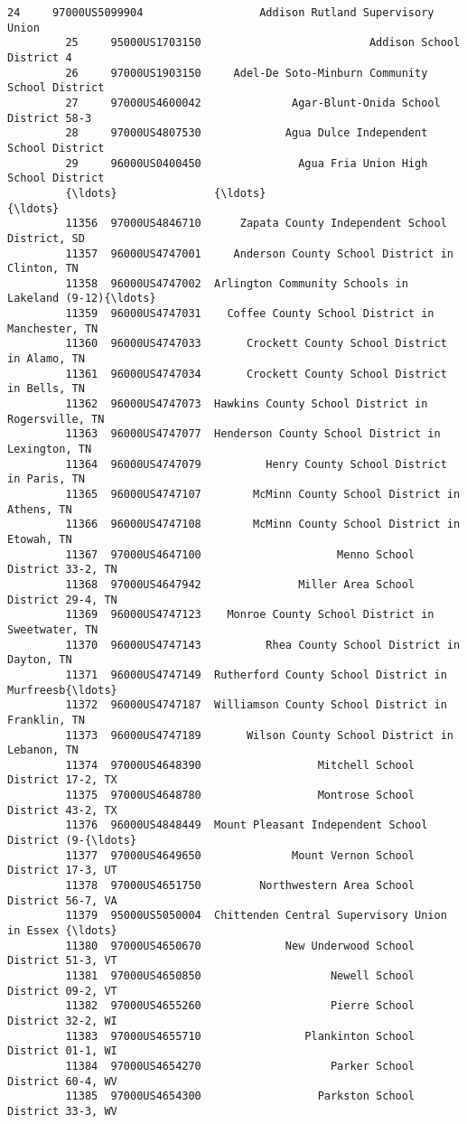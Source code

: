\documentclass[11pt]{article}
\begin{document}
\begin{Verbatim}[commandchars=\\\{\}]
         24     97000US5099904                  Addison Rutland Supervisory Union   
         25     95000US1703150                          Addison School District 4   
         26     97000US1903150     Adel-De Soto-Minburn Community School District   
         27     97000US4600042              Agar-Blunt-Onida School District 58-3   
         28     97000US4807530             Agua Dulce Independent School District   
         29     96000US0400450               Agua Fria Union High School District   
         {\ldots}               {\ldots}                                                {\ldots}   
         11356  97000US4846710      Zapata County Independent School District, SD   
         11357  96000US4747001     Anderson County School District in Clinton, TN   
         11358  96000US4747002  Arlington Community Schools in Lakeland (9-12){\ldots}   
         11359  96000US4747031    Coffee County School District in Manchester, TN   
         11360  96000US4747033       Crockett County School District in Alamo, TN   
         11361  96000US4747034       Crockett County School District in Bells, TN   
         11362  96000US4747073  Hawkins County School District in Rogersville, TN   
         11363  96000US4747077  Henderson County School District in Lexington, TN   
         11364  96000US4747079          Henry County School District in Paris, TN   
         11365  96000US4747107        McMinn County School District in Athens, TN   
         11366  96000US4747108        McMinn County School District in Etowah, TN   
         11367  97000US4647100                     Menno School District 33-2, TN   
         11368  97000US4647942               Miller Area School District 29-4, TN   
         11369  96000US4747123    Monroe County School District in Sweetwater, TN   
         11370  96000US4747143          Rhea County School District in Dayton, TN   
         11371  96000US4747149  Rutherford County School District in Murfreesb{\ldots}   
         11372  96000US4747187  Williamson County School District in Franklin, TN   
         11373  96000US4747189       Wilson County School District in Lebanon, TN   
         11374  97000US4648390                  Mitchell School District 17-2, TX   
         11375  97000US4648780                  Montrose School District 43-2, TX   
         11376  96000US4848449  Mount Pleasant Independent School District (9-{\ldots}   
         11377  97000US4649650              Mount Vernon School District 17-3, UT   
         11378  97000US4651750         Northwestern Area School District 56-7, VA   
         11379  95000US5050004  Chittenden Central Supervisory Union in Essex {\ldots}   
         11380  97000US4650670             New Underwood School District 51-3, VT   
         11381  97000US4650850                    Newell School District 09-2, VT   
         11382  97000US4655260                    Pierre School District 32-2, WI   
         11383  97000US4655710                Plankinton School District 01-1, WI   
         11384  97000US4654270                    Parker School District 60-4, WV   
         11385  97000US4654300                  Parkston School District 33-3, WV   
         

\end{Verbatim}
\end{document}
